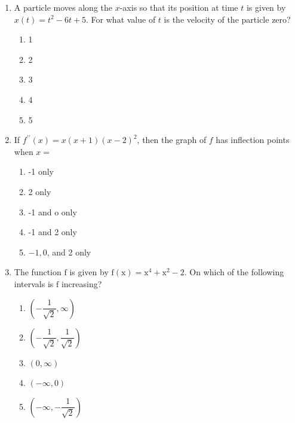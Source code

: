 \documentclass{article}
\begin{document}
\begin{enumerate}
\begin{minipage}[t]{\linewidth}
\begin{enumerate}
		\end{enumerate}
	\end{minipage}
	\item
	\begin{minipage}[t]{\linewidth}
		A particle moves along the \(x\)-axis so that its position at time \(t\)
is given by \(x(t)=t^{2}-6 t+5\). For what value of \(t\) is the
velocity of the particle zero?
\vspace{1em}
		\begin{enumerate}
		\itemsep1em
			\item 1
			\item 2
			\item 3
			\item 4
			\item 5
		\end{enumerate}
	\end{minipage}
	\item
	\begin{minipage}[t]{\linewidth}
		If \(f^{\prime \prime}(x)=x(x+1)(x-2)^{2}\), then the graph of \(f\) has
inflection points when \(x=\)
\vspace{1em}
		\begin{enumerate}
		\itemsep1em
			\item -1 only
			\item 2 only
			\item -1 and o only
			\item -1 and 2 only
			\item \(-1,0\), and 2 only
		\end{enumerate}
	\end{minipage}
	\item
	\begin{minipage}[t]{\linewidth}
		The function \(\mathrm{f}\) is given by
\(\mathrm{f}(\mathrm{x})=\mathrm{x}^{4}+\mathrm{x}^{2}-2\). On which of
the following intervals is \(\mathrm{f}\) increasing?
\vspace{1em}
		\begin{enumerate}
		\itemsep1em
			\item \(\left(-\dfrac{1}{\sqrt{2}}, \infty\right)\)
			\item \(\left(-\dfrac{1}{\sqrt{2}}, \dfrac{1}{\sqrt{2}}\right)\)
			\item \((0, \infty)\)
			\item \((-\infty, 0)\)
			\item \(\left(-\infty,-\dfrac{1}{\sqrt{2}}\right)\)
		\end{enumerate}
	\end{minipage}

\end{enumerate}
\end{document}
